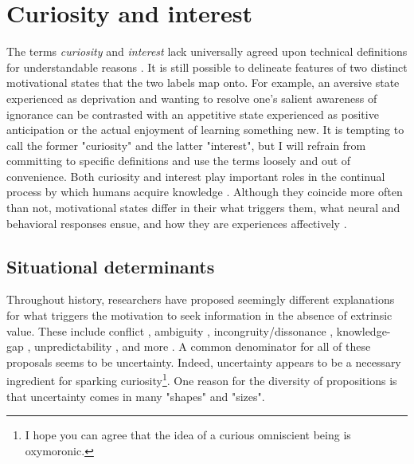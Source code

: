 \section{Curiosity and interest}

The terms \emph{curiosity} and \emph{interest} lack universally agreed upon technical definitions for understandable reasons \cite{kidd_psychology_2015,murayama_process_2019,dubey_reconciling_2020}. It is still possible to delineate features of two distinct motivational states that the two labels map onto. For example, an aversive state experienced as deprivation and wanting to resolve one's salient awareness of ignorance can be contrasted with an appetitive state experienced as positive anticipation or the actual enjoyment of learning something new. It is tempting to call the former "curiosity" and the latter "interest", but I will refrain from committing to specific definitions and use the terms loosely and out of convenience. Both curiosity and interest play important roles in the continual process by which humans acquire knowledge \cite{murayama_process_2019}. Although they coincide more often than not, motivational states differ in their what triggers them, what neural and behavioral responses ensue, and how they are experiences affectively \cite{day_curiosity_1982,grossnickle_disentangling_2016,hidi_interest_2019,shin_homo_2019,litman_curiosity_2019}.

\subsection{Situational determinants} 

Throughout history, researchers have proposed seemingly different explanations for what triggers the motivation to seek information in the absence of extrinsic value. These include conflict \cite{berlyne_theory_1954}, ambiguity \cite{ellsberg_risk_1961}, incongruity/dissonance \cite{hunt_experience_1960,festinger_theory_1962}, knowledge-gap \cite{loewenstein_psychology_1994}, unpredictability \cite{shin_homo_2019}, and more \cite[see ][for a review]{loewenstein_psychology_1994,oudeyer_what_2007,bazhydai_curiosity_2020}. A common denominator for all of these proposals seems to be uncertainty. Indeed, uncertainty appears to be a necessary ingredient for sparking curiosity\footnote{I hope you can agree that the idea of a curious omniscient being is oxymoronic.}. One reason for the diversity of propositions is that uncertainty comes in many "shapes" and "sizes".

